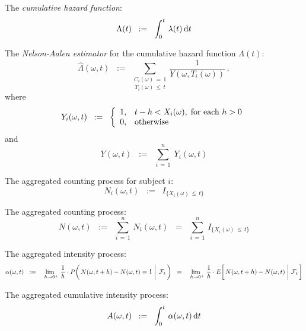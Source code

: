 \noindent
The \textit{cumulative hazard function}:
\begin{equation*}
\Lambda(t) \;\; := \;\; \int_{0}^{t}\,\lambda(t)\,\textnormal{d} t
\end{equation*}

\noindent
The \textit{Nelson-Aalen estimator} for the cumulative hazard function $\Lambda(t)$:
\begin{equation*}
\widehat{\Lambda}(\omega,t)
\;\; := \;\;
\underset{T_{i}(\omega)\,\leq\,t}{\underset{C_{i}(\omega)\,=\,1}{\sum}}\,
\dfrac{1}{Y(\omega,T_{i}(\omega))}\,,
\end{equation*}
where
\begin{equation*}
Y_{i}(\omega,t)
\;\; := \;\;
\left\{\begin{array}{cl}
1, & t - h < X_{i}(\omega), \;\textnormal{for each $h > 0$} \\
0, & \textnormal{otherwise}
\end{array}\right.
\end{equation*}
and
\begin{equation*}
Y(\omega,t) \;\; := \;\; \overset{n}{\underset{i\,=\,1}{\sum}}\; Y_{i}(\omega,t)
\end{equation*}

\vskip 0.5cm
\noindent
The aggregated counting process for subject $i$:
\begin{equation*}
N_{i}(\omega,t) \;\;:=\;\; I_{\{X_{i}(\omega)\,\leq\,t\}}
\end{equation*}

\noindent
The aggregated counting process:
\begin{equation*}
N(\omega,t)
\;\;:=\;\; \overset{n}{\underset{i\,=\,1}{\sum}}\,N_{i}(\omega,t)
\;\;=\;\;  \overset{n}{\underset{i\,=\,1}{\sum}}\,I_{\{X_{i}(\omega)\,\leq\,t\}}
\end{equation*}

\noindent
The aggregated intensity process:
\begin{equation*}
\alpha(\omega,t)
\;\; := \;\; \underset{\mbox{}\;\;h\rightarrow 0^{+}}{\lim} \;
	\dfrac{1}{h} \cdot P\!\left(\left.
	N(\omega,t+h) \overset{{\color{white}1}}{-} N(\omega,t) = 1
	\;\right\vert\;\mathcal{F}_{t}\,\right)
\;\; = \;\; \underset{\mbox{}\;\;h\rightarrow 0^{+}}{\lim} \;
	\dfrac{1}{h} \cdot E\!\left[\left.
	N(\omega,t+h) \overset{{\color{white}1}}{-} N(\omega,t)
	\;\right\vert\,\mathcal{F}_{t}\,\right]
\end{equation*}

\noindent
The aggregated cumulative intensity process:
\begin{equation*}
A(\omega,t) \;\; := \;\; \int^{t}_{0}\,\alpha(\omega,t)\,\textnormal{d} t
\end{equation*}

